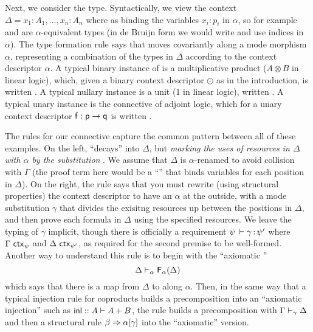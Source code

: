 Next, we consider the \F{\alpha}{\Delta} type.  Syntactically, we view
the context $\Delta = x_1:A_1,\ldots,x_n:A_n$ where  as
binding the variables $x_i:p_i$ in $\alpha$, so for example
 and  are
$\alpha$-equivalent types (in de Bruijn form we would write
 and use indices in $\alpha$).  The type
formation rule says that  moves covariantly along a mode morphism
$\alpha$, representing a combination of the types in $\Delta$ according
to the context descriptor $\alpha$.  A typical binary instance of
 is a multiplicative product ($A \otimes B$ in linear logic),
which, given a binary context descriptor $\odot$ as in the introduction,
is written .  A typical nullary instance is a unit
(1 in linear logic), written .  A typical unary instance is the
 connective of adjoint logic, which for a unary context
descriptor $\mathsf{f} : \mathsf{p} \to \mathsf{q}$ is written
.

The rules for our  connective capture the common pattern between
all of these examples.  On the left, \F{\alpha}{\Delta} ``decays'' into
$\Delta$, but \emph{marking the uses of resources in $\Delta$ with
  $\alpha$ by the substitution }.  We assume
that $\Delta$ is $\alpha$-renamed to avoid collision with $\Gamma$ (the
proof term here would be a ``'' that binds variables for each
position in $\Delta$).  On the right, the \FR rule says that you must
rewrite (using structural properties) the context descriptor to have an
$\alpha$ at the outside, with a mode substitution $\gamma$ that divides
the exisitng resources up between the positions in $\Delta$, and then
prove each formula in $\Delta$ using the specified resources.  We leave
the typing of $\gamma$ implicit, though there is officially a
requirement $\psi \, \vdash \gamma \, \mathit{:} \, \psi'$ where $\Gamma \,\, \mathsf{ctx}_{\psi}$
and $\Delta \,\, \mathsf{ctx}_{\psi'}$, as required for the second premise to be
well-formed.  Another way to understand this rule is to begin with
the ``axiomatic \FR'' 
\[
{\Delta \vdash_{\alpha} \mathsf{F}_{\alpha}(\Delta)}
\]
which says that there is a map from $\Delta$ to \F{\alpha}{\Delta} along
$\alpha$.  Then, in the same way that a typical injection rule for
coproducts builds a precomposition into an ``axiomatic injection'' such
as $\mathsf{inl} :: A \vdash A + B$, the \FR\/ rule builds a precomposition
with $\Gamma \vdash_{\gamma} \Delta$ and then a structural rule $\beta
\Rightarrow \alpha[\gamma]$ into the ``axiomatic'' version.  


